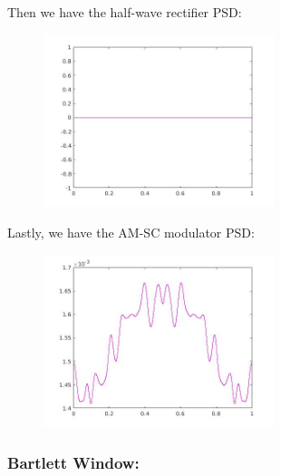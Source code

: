\documentclass[a4paper,11pt]{article}
\begin{document}
Then we have the half-wave rectifier PSD:

\begin{figure}[!hp]
    \begin{center}
    \includegraphics[width=0.6\textwidth]{images/lab3_36.jpg}
    \end{center}
\end{figure}

\newpage

Lastly, we have the AM-SC modulator PSD:

\begin{figure}[!hp]
    \begin{center}
    \includegraphics[width=0.6\textwidth]{images/lab3_46.jpg}
    \end{center}
\end{figure}

\subsubsection{Bartlett Window:}
\end{document}
